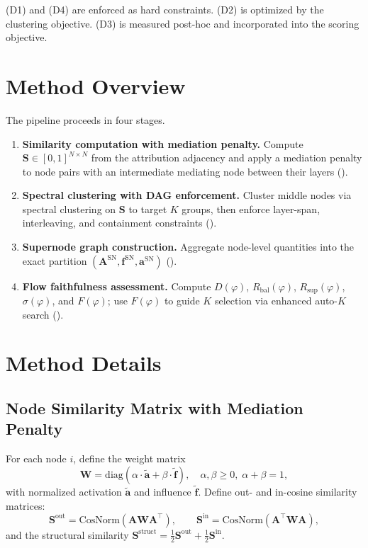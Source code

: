 \documentclass[11pt]{article}
\newcommand{\bA}{\mathbf{A}}
\newcommand{\bS}{\mathbf{S}}
\newcommand{\bW}{\mathbf{W}}
\newcommand{\1}{\mathbbm{1}}
\newcommand{\Dphi}{D(\varphi)}
\newcommand{\Rbal}{R_{\mathrm{bal}}(\varphi)}
\newcommand{\Rsup}{R_{\mathrm{sup}}(\varphi)}
\newcommand{\Fphi}{F(\varphi)}
\newcommand{\snAdj}{\mathbf{A}^{\mathrm{SN}}}
\newcommand{\snInf}{\mathbf{f}^{\mathrm{SN}}}
\newcommand{\snAct}{\mathbf{a}^{\mathrm{SN}}}
\begin{document}
(D1) and (D4) are enforced as hard constraints. (D2) is optimized by the clustering objective. (D3) is measured post-hoc and incorporated into the scoring objective.

\section{Method Overview}
\label{sec:overview}

The pipeline proceeds in four stages.

\begin{enumerate}[leftmargin=2em, label=\textbf{Stage \arabic*.}]
  \item \textbf{Similarity computation with mediation penalty.} Compute $\bS \in [0,1]^{N \times N}$ from the attribution adjacency and apply a mediation penalty to node pairs with an intermediate mediating node between their layers ().
  \item \textbf{Spectral clustering with DAG enforcement.} Cluster middle nodes via spectral clustering on $\bS$ to target $K$ groups, then enforce layer-span, interleaving, and containment constraints ().
  \item \textbf{Supernode graph construction.} Aggregate node-level quantities into the exact partition $(\snAdj, \snInf, \snAct)$ ().
  \item \textbf{Flow faithfulness assessment.} Compute $\Dphi$, $\Rbal$, $\Rsup$, $\sigma(\varphi)$, and $\Fphi$; use $\Fphi$ to guide $K$ selection via enhanced auto-$K$ search ().
\end{enumerate}

\section{Method Details}
\label{sec:details}

\subsection{Node Similarity Matrix with Mediation Penalty}
\label{sec:similarity}

For each node $i$, define the weight matrix
\[
  \bW = \mathrm{diag}\!\left(\alpha \cdot \tilde{\mathbf{a}} + \beta \cdot \tilde{\mathbf{f}}\right), \quad \alpha, \beta \ge 0,\; \alpha + \beta = 1,
\]
with normalized activation $\tilde{\mathbf{a}}$ and influence $\tilde{\mathbf{f}}$.
Define out- and in-cosine similarity matrices:
\[
  \bS^{\mathrm{out}} = \mathrm{CosNorm}(\bA \bW \bA^\top), \qquad
  \bS^{\mathrm{in}}  = \mathrm{CosNorm}(\bA^\top \bW \bA),
\]
and the structural similarity $\bS^{\mathrm{struct}} = \frac{1}{2}\bS^{\mathrm{out}} + \frac{1}{2}\bS^{\mathrm{in}}$.
\end{document}
